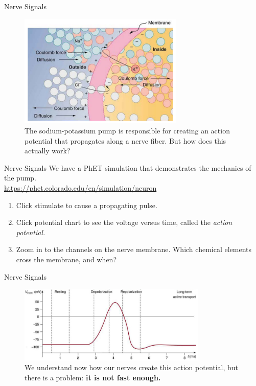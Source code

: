 \documentclass{beamer}
\begin{document}
\begin{frame}{Nerve Signals}
\begin{figure}
\centering
\includegraphics[width=0.7\textwidth]{figures/nerve2.png}
\caption{\label{fig:nerve2} The sodium-potassium pump is responsible for creating an action potential that propagates along a nerve fiber.  But how does this actually work?}
\end{figure}
\end{frame}

\begin{frame}{Nerve Signals}
We have a PhET simulation that demonstrates the mechanics of the pump. \\ \vspace{1cm}
\url{https://phet.colorado.edu/en/simulation/neuron}
\begin{enumerate}
\item Click stimulate to cause a propagating pulse.
\item Click potential chart to see the voltage versus time, called the \textit{action potential.}
\item Zoom in to the channels on the nerve membrane.  Which chemical elements cross the membrane, and when?
\end{enumerate}
\end{frame}

\begin{frame}{Nerve Signals}
\begin{figure}
\centering
\includegraphics[width=0.8\textwidth]{figures/nerve3.png}
\caption{\label{fig:nerve3} We understand now how our nerves create this action potential, but there is a problem: \textbf{it is not fast enough.}}
\end{figure}
\end{frame}
\end{document}

